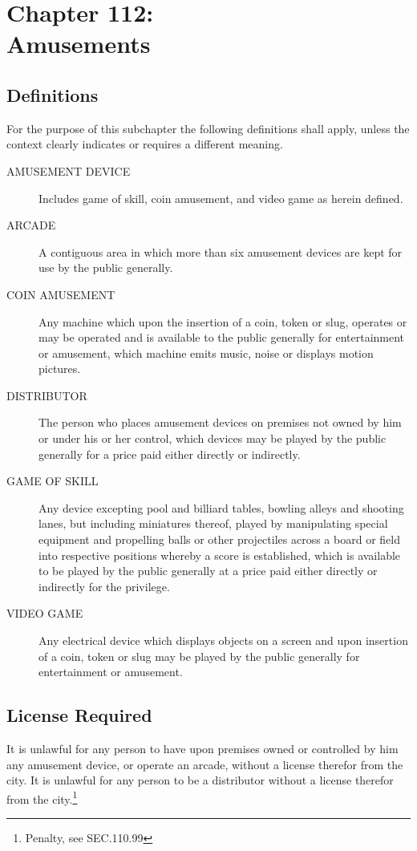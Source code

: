 \chapter*{Chapter 112: \\
	Amusements}
    \vfill
    \minitoc
    \pagebreak


\section{Definitions}
For the purpose of this subchapter the following definitions shall apply, unless the context clearly indicates or requires a different meaning.
\begin{description}
    \item[AMUSEMENT DEVICE] Includes game of skill, coin amusement, and video game as herein defined.
    \item[ARCADE] A contiguous area in which more than six amusement devices are kept for use by the public generally.
    \item[COIN AMUSEMENT] Any machine which upon the insertion of a coin, token or slug, operates or may be operated and is available to the public generally for entertainment or amusement, which machine emits music, noise or displays motion pictures.
    \item[DISTRIBUTOR] The person who places amusement devices on premises not owned by him or under his or her control, which devices may be played by the public generally for a price paid either directly or indirectly.
    \item[GAME OF SKILL] Any device excepting pool and billiard tables, bowling alleys and shooting lanes, but including miniatures thereof, played by manipulating special equipment and propelling balls or other projectiles across a board or field into respective positions whereby a score is established, which is available to be played by the public generally at a price paid either directly or indirectly for the privilege.
    \item[VIDEO GAME] Any electrical device which displays objects on a screen and upon insertion of a coin, token or slug may be played by the public generally for entertainment or amusement.
\end{description}

\section{License Required}
It is unlawful for any person to have upon premises owned or controlled by him any amusement device, or operate an arcade, without a license therefor from the city. It is unlawful for any person to be a distributor without a license therefor from the city.\footnote{Penalty, see SEC.110.99}

